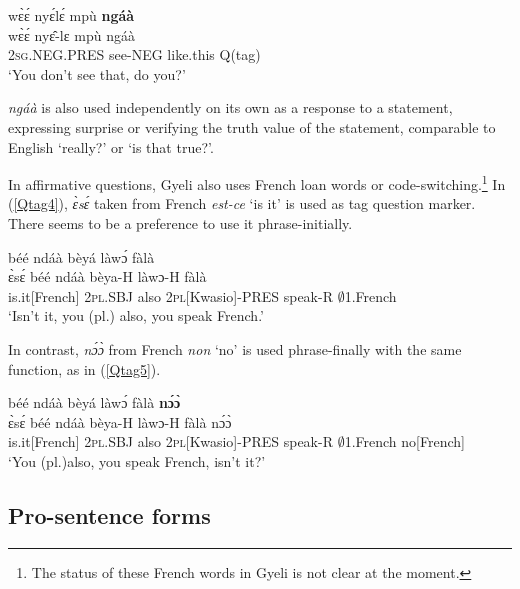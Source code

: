 \begin{exe} 
\ex\label{Qtag3}
  \glll wɛ̀ɛ́ nyɛ́lɛ́ mpù {\bfseries ngáà} \\
       wɛ̀ɛ́ nyɛ̂-lɛ mpù ngáà \\
        2\textsc{sg}.NEG.PRES see-NEG like.this Q(tag) \\
    \trans `You don't see that, do you?'
\end{exe}


{\itshape ngáà} is also used independently on its own as a response to a statement, expressing surprise or verifying the truth value of the statement, comparable to English  `really?' or `is that true?'.

In affirmative questions, Gyeli also uses French loan words or code-switching.\footnote{The status of these French words in Gyeli is not clear at the moment.} In (\ref{Qtag4}), {\itshape ɛ̀sɛ́} taken from French {\itshape est-ce} `is it' is used as tag question marker. There seems to be a preference to use it phrase-initially.

\begin{exe} 
\ex\label{Qtag4} 
   béé ndáà bèyá làwɔ́ fàlà \\
       ɛ̀sɛ́ béé ndáà bèya-H làwɔ-H fàlà \\
        is.it[French] 2\textsc{pl}.SBJ also 2\textsc{pl}[Kwasio]-PRES speak-R $\emptyset$1.French  \\
    \trans `Isn't it, you (pl.) also, you speak French.'
\end{exe}

In contrast, {\itshape nɔ́ɔ̀} from French {\itshape non} `no' is used phrase-finally with the same function, as in (\ref{Qtag5}).

\begin{exe} 
\ex\label{Qtag5} 
  \glll  béé ndáà bèyá làwɔ́ fàlà {\bfseries nɔ́ɔ̀} \\
       ɛ̀sɛ́ béé ndáà bèya-H làwɔ-H fàlà nɔ́ɔ̀ \\
        is.it[French] 2\textsc{pl}.SBJ also 2\textsc{pl}[Kwasio]-PRES speak-R $\emptyset$1.French no[French] \\
    \trans `You (pl.)also, you speak French, isn't it?'
\end{exe}




\subsection{Pro-sentence forms}
\label{sec:ProSent}

